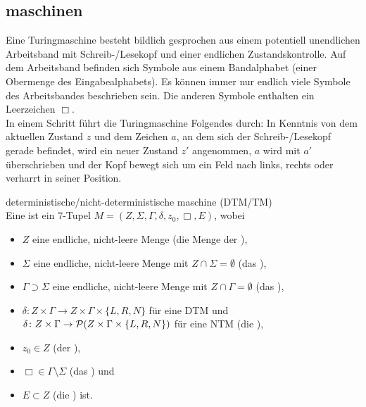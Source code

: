 \subsection{%
    maschinen%
}

\begin{Bem}
    Eine Turingmaschine besteht bildlich gesprochen aus einem potentiell
    unendlichen Arbeitsband mit Schreib-/Lesekopf und einer endlichen
    Zustandskontrolle.
    Auf dem Arbeitsband befinden sich Symbole aus einem Bandalphabet
    (einer Obermenge des Eingabealphabets).
    Es können immer nur endlich viele Symbole des Arbeitsbandes beschrieben
    sein.
    Die anderen Symbole enthalten ein Leerzeichen $\Box$.\\
    In einem Schritt führt die Turingmaschine Folgendes durch:
    In Kenntnis von dem aktuellen Zustand $z$ und dem Zeichen $a$, an dem sich
    der Schreib-/Lesekopf gerade befindet, wird ein neuer Zustand $z'$
    angenommen, $a$ wird mit $a'$ überschrieben und der Kopf bewegt sich um
    ein Feld nach links, rechts oder verharrt in seiner Position.
\end{Bem}

\linie
\pagebreak

\begin{Def}{deterministische/nicht-deterministische
            maschine (DTM/TM)}\\
    Eine 
    ist ein $7$-Tupel $M = (Z, \Sigma, \Gamma, \delta, z_0, \Box, E)$, wobei
    \begin{itemize}
        \item
        $Z$ eine endliche, nicht-leere Menge
        (die Menge der ),
        
        \item
        $\Sigma$ eine endliche, nicht-leere Menge
        mit $Z \cap \Sigma = \emptyset$
        (das ),
        
        \item
        $\Gamma \supset \Sigma$ eine endliche, nicht-leere Menge
        mit $Z \cap \Gamma = \emptyset$
        (das ),
        
        \item
        $\delta\colon Z \times \Gamma \rightarrow
        Z \times \Gamma \times \{L, R, N\}$ für eine DTM und\\
        $\delta\colon Z \times \Gamma \rightarrow
        \P(Z \times \Gamma \times \{L, R, N\})$ für eine NTM
        (die ),
        
        \item
        $z_0 \in Z$ (der ),
        
        \item
        $\Box \in \Gamma \setminus \Sigma$ (das ) und
        
        \item
        $E \subset Z$ (die ) ist.
    \end{itemize}
\end{Def}

